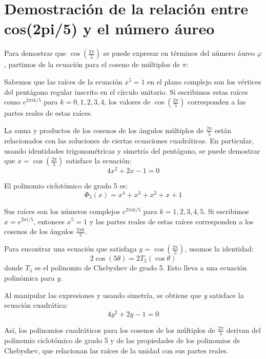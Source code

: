 \section{Demostración de la relación entre cos(2pi/5) y el número áureo}\label{sec:cosenoaureo}
Para demostrar que $\cos\left(\frac{2\pi}{5}\right)$ se puede expresar en términos del número áureo $\varphi$, partimos de la ecuación para el coseno de múltiplos de $\pi$:

Sabemos que las raíces de la ecuación $x^5 = 1$ en el plano complejo son los vértices del pentágono regular inscrito en el círculo unitario. Si escribimos estas raíces como $e^{2\pi i k/5}$ para $k=0,1,2,3,4$, los valores de $\cos\left(\frac{2\pi}{5}\right)$ corresponden a las partes reales de estas raíces.

La suma y productos de los cosenos de los ángulos múltiplos de $\frac{2\pi}{5}$ están relacionados con las soluciones de ciertas ecuaciones cuadráticas. En particular, usando identidades trigonométricas y simetría del pentágono, se puede demostrar que $x = \cos\left(\frac{2\pi}{5}\right)$ satisface la ecuación:
\begin{equation*}
4x^2 + 2x - 1 = 0
\end{equation*}

El polinomio ciclotómico de grado 5 es:
\begin{equation*}
\Phi_5(x) = x^4 + x^3 + x^2 + x + 1
\end{equation*}

Sus raíces son los números complejos $e^{2\pi i k/5}$ para $k=1,2,3,4,5$. Si escribimos $x = e^{2\pi i/5}$, entonces $x^5 = 1$ y las partes reales de estas raíces corresponden a los cosenos de los ángulos $\frac{2\pi k}{5}$.

Para encontrar una ecuación que satisfaga $y = \cos\left(\frac{2\pi}{5}\right)$, usamos la identidad:
\begin{equation}\label{eq:chebyshev_identity}
2\cos(5\theta) = 2T_5(\cos\theta)
\end{equation}
donde $T_5$ es el polinomio de Chebyshev de grado 5. Esto lleva a una ecuación polinómica para $y$.

Al manipular las expresiones y usando simetría, se obtiene que $y$ satisface la ecuación cuadrática:
\begin{equation}\label{eq:ecuacion_cuadratica_cos}
4y^2 + 2y - 1 = 0
\end{equation}

Así, los polinomios cuadráticos para los cosenos de los múltiplos de $\frac{2\pi}{5}$ derivan del polinomio ciclotómico de grado 5 y de las propiedades de los polinomios de Chebyshev, que relacionan las raíces de la unidad con sus partes reales.


